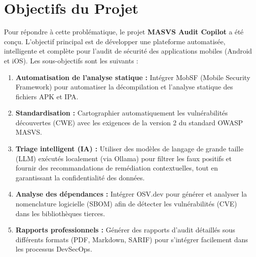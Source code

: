 \section{Objectifs du Projet}
Pour répondre à cette problématique, le projet \textbf{MASVS Audit Copilot} a été conçu. L'objectif principal est de développer une plateforme automatisée, intelligente et complète pour l'audit de sécurité des applications mobiles (Android et iOS). Les sous-objectifs sont les suivants :

\begin{enumerate}[label=\textbf{\textcolor{AccentCyan}{\arabic*.}}]
    \item \textbf{Automatisation de l'analyse statique :} Intégrer MobSF (Mobile Security Framework) pour automatiser la décompilation et l'analyse statique des fichiers APK et IPA.
    \item \textbf{Standardisation :} Cartographier automatiquement les vulnérabilités découvertes (CWE) avec les exigences de la version 2 du standard OWASP MASVS.
    \item \textbf{Triage intelligent (IA) :} Utiliser des modèles de langage de grande taille (LLM) exécutés localement (via Ollama) pour filtrer les faux positifs et fournir des recommandations de remédiation contextuelles, tout en garantissant la confidentialité des données.
    \item \textbf{Analyse des dépendances :} Intégrer OSV.dev pour générer et analyser la nomenclature logicielle (SBOM) afin de détecter les vulnérabilités (CVE) dans les bibliothèques tierces.
    \item \textbf{Rapports professionnels :} Générer des rapports d'audit détaillés sous différents formats (PDF, Markdown, SARIF) pour s'intégrer facilement dans les processus DevSecOps.
\end{enumerate}

